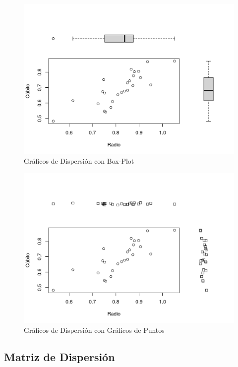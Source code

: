 \documentclass[12pt,a4paper,]{book}
\numberwithin{dummy}{section}
\theoremstyle{ocrenumbox}
\theoremstyle{ocrenumbox}
\theoremstyle{ocrenumbox}
\theoremstyle{ocrenumbox}
\theoremstyle{ocrenum}
\begin{document}
\begin{figure}[H]

{\centering \includegraphics[width=0.8\linewidth]{figurasR/grafica1d-1} 

}

\caption{Gráficos de Dispersión con Box-Plot}\label{fig:grafica1d}
\end{figure}

\begin{figure}[H]

{\centering \includegraphics[width=0.8\linewidth]{figurasR/grafica1e-1} 

}

\caption{Gráficos de Dispersión con Gráficos de Puntos}\label{fig:grafica1e}
\end{figure}

\hypertarget{matriz-de-dispersiuxf3n}{%
\subsection{Matriz de Dispersión}\label{matriz-de-dispersiuxf3n}}
\end{document}
